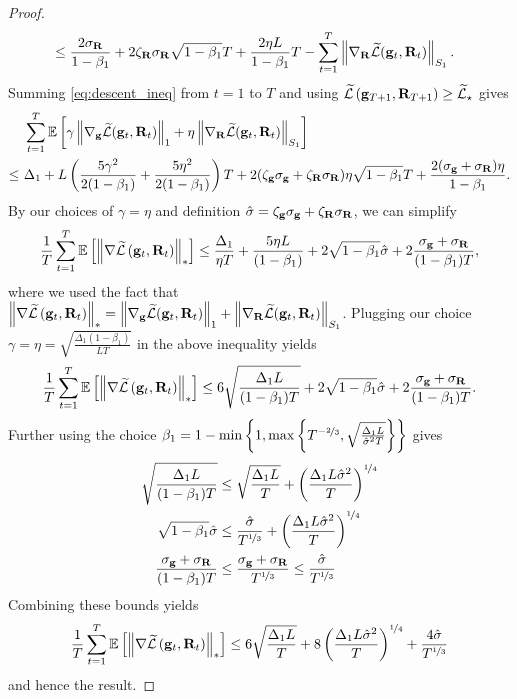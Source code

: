 {\begin{proof}
\begin{align*}
    &\leq 
    \frac {2\sigma_{\mathbf{R}}} {1-\beta_1}  
    + 2\zeta_{\mathbf{R}} \sigma_{\mathbf{R}} \sqrt{1-\beta_1} T
    + \frac{2\eta L}{1-\beta_1}T
    - \sum_{t=1}^T \left \| \nabla_{\mathbf{R}} \widetilde {\mathcal{L}}(\mathbf{g}_t, \mathbf{R}_t) \right\|_{S_1}.
\end{align*}
Summing \eqref{eq:descent_ineq} from $t=1$ to $T$ and using $\widetilde {\mathcal{L}}\left( \mathbf{g}_{T+1}, \mathbf{R}_{T+1} \right) \geq \widetilde {\mathcal{L}}_\star$ gives
\begin{align*}
    &\ \sum_{t=1}^T \E\left[\gamma \norm{\gradgt}_1 + \eta \trnorm{\gradRt}\right] \\
    \leq &\ 
    \Delta_1
    + L \pare{\frac{5\gamma^2}{2(1-\beta_1)} + \frac{5\eta^2}{2(1-\beta_1)}}T
    + 2 (\zeta_\g \sigg + \zeta_\Rbf \sigR)\eta \sqrt{1-\beta_1}  T
    + \frac{2(\sigg + \sigR)\eta}{1-\beta_1}.
\end{align*}
By our choices of $\gamma = \eta$ and definition $\hat \sigma = \zeta_{\mathbf{g}} \sigma_{\mathbf{g}} + \zeta_{\mathbf{R}} \sigma_{\mathbf{R}}$, we can simplify
\begin{equation}
    \frac{1}{T}\sum_{t=1}^T \mathbb{E}\left[\left \| \nabla \widetilde {\mathcal{L}}\left( \mathbf{g}_t,\mathbf{R}_t \right) \right\|_*\right]
    \leq 
    \frac{\Delta_1}{\eta T}
    + \frac{5 \eta L}{(1- \beta_1)}
    + 2 \sqrt{1-\beta_1}\hat \sigma 
    + 2\frac{\sigma_{\mathbf{g}} + \sigma_{\mathbf{R}}}{(1-\beta_1) T},
\end{equation}
where we used the fact that $\left \| \nabla \widetilde {\mathcal{L}} \left( \mathbf{g}_t, \mathbf{R}_t \right) \right\|_* = \left \| \nabla_{\mathbf{g}} \widetilde {\mathcal{L}}(\mathbf{g}_t, \mathbf{R}_t) \right\|_1 + \left \| \nabla_{\mathbf{R}} \widetilde {\mathcal{L}}(\mathbf{g}_t, \mathbf{R}_t) \right\|_{S_1}$. Plugging our choice $\gamma = \eta = \sqrt{\frac{\Delta_1 (1-\beta_1)}{L T}}$ in the above inequality yields
\begin{equation*}
    \frac{1}{T}\sum_{t=1}^T \mathbb{E}\left[\left \| \nabla \widetilde {\mathcal{L}}\left( \mathbf{g}_t,\mathbf{R}_t \right) \right\|_*\right]
    \leq 
    6\sqrt{\frac{\Delta_1 L}{(1-\beta_1) T}}
    + 2 \sqrt{1-\beta_1} \hat \sigma
    + 2\frac{\sigma_{\mathbf{g}} + \sigma_{\mathbf{R}}}{(1-\beta_1) T}.
\end{equation*}
Further using the choice $\beta_1 = 1 - \min\left\{1, \max\left\{T^{-\nicefrac 2 3}, \sqrt{\frac{\Delta_1 L}{\hat \sigma^2 T}}\right\}\right\}$ gives
\begin{align*}
    \sqrt{\frac{\Delta_1 L}{(1-\beta_1) T}}
    &\leq \sqrt{\frac{\Delta_1 L}{T}} + \left( \frac{\Delta_1 L \hat \sigma^2}{T} \right)^{\nicefrac 1 4}\\
    \sqrt{1-\beta_1} \hat \sigma
    &\leq \frac{\hat \sigma}{T^{\nicefrac 1 3}} + \left( \frac{\Delta_1 L \hat \sigma^2}{T} \right)^{\nicefrac 1 4}\\
    \frac{ \sigma_{\mathbf{g}} + \sigma_{\mathbf{R}}}{(1-\beta_1) T}
    &\leq \frac{\sigma_{\mathbf{g}} + \sigma_{\mathbf{R}}}{T^{\nicefrac 1 3}}
    \leq \frac{\hat \sigma}{T^{\nicefrac 1 3}}
\end{align*}
Combining these bounds yields 
\begin{equation*}
    \frac{1}{T}\sum_{t=1}^T \mathbb{E}\left[\left \| \nabla \widetilde {\mathcal{L}}\left( \mathbf{g}_t,\mathbf{R}_t \right) \right\|_*\right]
    \leq 
    6 \sqrt{\frac{\Delta_1 L}{T}}
    + 8 \left( \frac{\Delta_1 L \hat \sigma^2}{T} \right)^{\nicefrac 1 4}
    + \frac{4 \hat \sigma}{T^{\nicefrac 1 3}}
\end{equation*}
and hence the result.
    
\end{proof}
}
